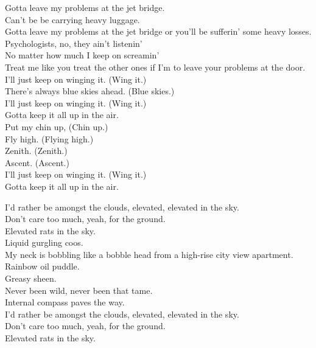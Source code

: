 Gotta leave my problems at the jet bridge. \\
Can't be be carrying heavy luggage. \\
Gotta leave my problems at the jet bridge or you'll be sufferin' some heavy losses. \\
Psychologists, no, they ain't listenin' \\
No matter how much I keep on screamin' \\
Treat me like you treat the other ones if I'm to leave your problems at the door. \\

I'll just keep on winging it. (Wing it.) \\
There's always blue skies ahead. (Blue skies.) \\
I'll just keep on winging it. (Wing it.) \\
Gotta keep it all up in the air. \\
Put my chin up, (Chin up.) \\
Fly high. (Flying high.) \\
Zenith. (Zenith.) \\
Ascent. (Ascent.) \\
I'll just keep on winging it. (Wing it.) \\
Gotta keep it all up in the air. \\



I'd rather be amongst the clouds, elevated, elevated in the sky. \\
Don't care too much, yeah, for the ground. \\
Elevated rats in the sky. \\
Liquid gurgling coos. \\
My neck is bobbling like a bobble head from a high-rise city view apartment. \\
Rainbow oil puddle. \\
Greasy sheen. \\
Never been wild, never been that tame. \\
Internal compass paves the way. \\
I'd rather be amongst the clouds, elevated, elevated in the sky. \\
Don't care too much, yeah, for the ground. \\
Elevated rats in the sky. \\

